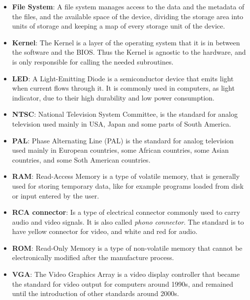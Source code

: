 \begin{itemize}
    \item \textbf{File System}: A file system manages access to the data and the
        metadata of the files, and the available space of the device, dividing
        the storage area into units of storage and keeping a map of every
        storage unit of the device.
    \item \textbf{Kernel}: The Kernel is a layer of the operating system that
        it is in between the software and the BIOS. Thus the Kernel is agnostic
        to the hardware, and is only responsible for calling the needed
        subroutines.
    \item \textbf{LED}: A Light-Emitting Diode is a semiconductor device that
        emits light when current flows through it. It is commonly used in
        computers, as light indicator, due to their high durability and low
        power consumption.
        \item \textbf{NTSC}: National Television System Committee, is the
        standard for analog television used mainly in USA, Japan and some parts
        of South America.
    \item \textbf{PAL}: Phase Alternating Line (PAL) is the standard for analog
        television used mainly in European countries, some African countries,
        some Asian countries, and some Soth American countries.
    \item \textbf{RAM}: Read-Access Memory is a type of volatile memory, that is
        generally used for storing temporary data, like for example programs
        loaded from disk or input entered by the user.
    \item \textbf{RCA connector}: Is a type of electrical connector commonly
        used to carry audio and video signals. It is also called
        \textit{phono connector}. The standard is to have yellow connector for
        video, and white and red for audio.
    \item \textbf{ROM}: Read-Only Memory is a type of non-volatile memory that 
        cannot be electronically modified after the manufacture process.
    \item \textbf{VGA}: The Video Graphics Array is a video display controller
        that became the standard for video output for computers around 1990s,
        and remained until the introduction of other standards around 2000s.
\end{itemize}
